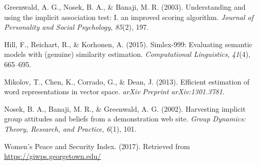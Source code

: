 \documentclass[10pt, letterpaper]{article}
\begin{document}
\hypertarget{ref-greenwald2003understanding}{}
Greenwald, A. G., Nosek, B. A., \& Banaji, M. R. (2003). Understanding
and using the implicit association test: I. an improved scoring
algorithm. \emph{Journal of Personality and Social Psychology},
\emph{85}(2), 197.

\hypertarget{ref-hill2015simlex}{}
Hill, F., Reichart, R., \& Korhonen, A. (2015). Simlex-999: Evaluating
semantic models with (genuine) similarity estimation.
\emph{Computational Linguistics}, \emph{41}(4), 665--695.

\hypertarget{ref-mikolov2013efficient}{}
Mikolov, T., Chen, K., Corrado, G., \& Dean, J. (2013). Efficient
estimation of word representations in vector space. \emph{arXiv Preprint
arXiv:1301.3781}.

\hypertarget{ref-nosek2002harvesting}{}
Nosek, B. A., Banaji, M. R., \& Greenwald, A. G. (2002). Harvesting
implicit group attitudes and beliefs from a demonstration web site.
\emph{Group Dynamics: Theory, Research, and Practice}, \emph{6}(1), 101.

\hypertarget{ref-wps}{}
Women's Peace and Security Index. (2017). Retrieved from
\url{https://giwps.georgetown.edu/}
\end{document}
